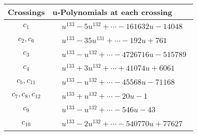 \documentclass[1p]{elsarticle_modified}
\theoremstyle{definition}
\begin{document}
\begin{tabular}{m{50pt}|m{274pt}}
Crossings & \hspace{64pt}u-Polynomials at each crossing \\
\hline $$\begin{aligned}c_{1}\end{aligned}$$&$\begin{aligned}
&u^{133}-5 u^{132}+\cdots-161632 u-14048
\end{aligned}$\\
\hline $$\begin{aligned}c_{2},c_{6}\end{aligned}$$&$\begin{aligned}
&u^{133}-35 u^{131}+\cdots-192 u+761
\end{aligned}$\\
\hline $$\begin{aligned}c_{3}\end{aligned}$$&$\begin{aligned}
&u^{133}- u^{132}+\cdots-4726716 u-515789
\end{aligned}$\\
\hline $$\begin{aligned}c_{4}\end{aligned}$$&$\begin{aligned}
&u^{133}+3 u^{132}+\cdots+41074 u+6061
\end{aligned}$\\
\hline $$\begin{aligned}c_{5},c_{11}\end{aligned}$$&$\begin{aligned}
&u^{133}- u^{132}+\cdots-45568 u-71168
\end{aligned}$\\
\hline $$\begin{aligned}c_{7},c_{8},c_{12}\end{aligned}$$&$\begin{aligned}
&u^{133}+u^{132}+\cdots-20 u-1
\end{aligned}$\\
\hline $$\begin{aligned}c_{9}\end{aligned}$$&$\begin{aligned}
&u^{133}- u^{132}+\cdots-546 u-43
\end{aligned}$\\
\hline $$\begin{aligned}c_{10}\end{aligned}$$&$\begin{aligned}
&u^{133}-2 u^{132}+\cdots-540770 u+77627
\end{aligned}$\\
\hline
\end{tabular}\\~\\
\end{document}
